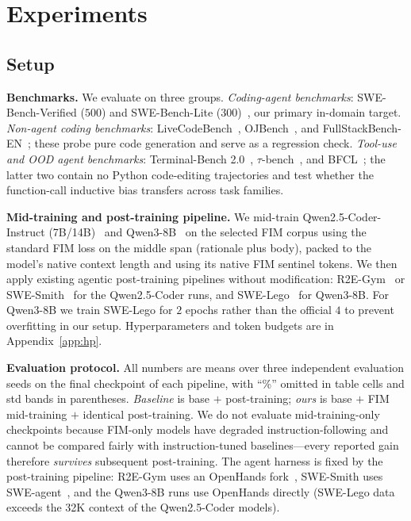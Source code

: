 
\section{Experiments}
\label{sec:exp}
\vspace{-0.5ex}

\subsection{Setup}
\label{sec:exp:setup}

\textbf{Benchmarks.} We evaluate on three groups.
\emph{Coding-agent benchmarks}: SWE-Bench-Verified ($500$) and
SWE-Bench-Lite ($300$)~\citep{swebench}, our primary in-domain target.
\emph{Non-agent coding benchmarks}: LiveCodeBench~\citep{livecodebench},
OJBench~\citep{ojbench}, and FullStackBench-EN~\citep{fullstackbench};
these probe pure code generation and serve as a regression check.
\emph{Tool-use and OOD agent benchmarks}: Terminal-Bench 2.0~\citep{terminalbench},
$\tau$-bench~\citep{taubench}, and BFCL~\citep{bfcl}; the latter two
contain no Python code-editing trajectories and test whether the
function-call inductive bias transfers across task families.

\textbf{Mid-training and post-training pipeline.}
We mid-train Qwen2.5-Coder-Instruct (7B/14B)~\citep{qwencoder} and
Qwen3-8B~\citep{qwen3} on the selected FIM corpus
using the standard FIM loss on the middle span
(rationale plus body), packed to the model's native context length and
using its native FIM sentinel tokens. We then apply existing agentic
post-training pipelines without modification:
R2E-Gym~\citep{r2egym} or SWE-Smith~\citep{swesmith} for the
Qwen2.5-Coder runs, and SWE-Lego~\citep{swelego} for Qwen3-8B. For
Qwen3-8B we train SWE-Lego for $2$ epochs rather than the official $4$
to prevent overfitting in our setup. Hyperparameters and token budgets
are in Appendix~\ref{app:hp}.

\textbf{Evaluation protocol.}
All numbers are means over three independent evaluation seeds on the
final checkpoint of each pipeline, with ``\%'' omitted in table cells
and std bands in parentheses. \emph{Baseline} is base $+$ post-training;
\emph{ours} is base $+$ FIM mid-training $+$ identical post-training.
We do not evaluate mid-training-only checkpoints because FIM-only models
have degraded instruction-following and cannot be compared fairly with
instruction-tuned baselines---every reported gain therefore
\emph{survives} subsequent post-training. The agent harness is fixed by
the post-training pipeline: R2E-Gym uses an OpenHands fork~\citep{openhands,
r2egym}, SWE-Smith uses SWE-agent~\citep{sweagent}, and the Qwen3-8B
runs use OpenHands directly (SWE-Lego data exceeds the 32K context of
the Qwen2.5-Coder models).

